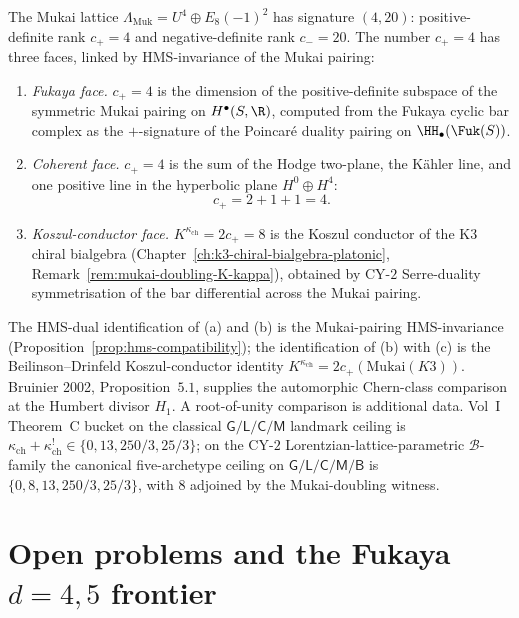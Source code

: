 \begin{remark}
\label{rem:fuk-three-faces-of-8}
The Mukai lattice $\Lambda_{\mathrm{Muk}} = U^4 \oplus E_8(-1)^2$ has signature $(4,20)$: positive-definite rank $c_+ = 4$ and negative-definite rank $c_- = 20$. The number $c_+ = 4$ has three faces, linked by HMS-invariance of the Mukai pairing:
\begin{enumerate}[label=(\alph*)]
 \item \emph{Fukaya face.} $c_+ = 4$ is the dimension of the positive-definite subspace of the symmetric Mukai pairing on $H^\bullet(S,\R)$, computed from the Fukaya cyclic bar complex as the $+$-signature of the Poincar\'{e} duality pairing on $\HH_\bullet(\Fuk(S))$.
 \item \emph{Coherent face.} $c_+ = 4$ is the sum of the Hodge two-plane, the K\"ahler line, and one positive line in the hyperbolic plane \(H^0\oplus H^4\):
 \[
 c_+ = 2 + 1 + 1 = 4.
 \]
 \item \emph{Koszul-conductor face.} $K^{\kappa_{\mathrm{ch}}} = 2c_+ = 8$ is the Koszul conductor of the K3 chiral bialgebra (Chapter~\ref{ch:k3-chiral-bialgebra-platonic}, Remark~\ref{rem:mukai-doubling-K-kappa}), obtained by CY-$2$ Serre-duality symmetrisation of the bar differential across the Mukai pairing.
\end{enumerate}
The HMS-dual identification of (a) and (b) is the Mukai-pairing HMS-invariance (Proposition~\ref{prop:hms-compatibility}); the identification of (b) with (c) is the Beilinson--Drinfeld Koszul-conductor identity \(K^{\kappa_{\mathrm{ch}}} = 2c_+(\mathrm{Mukai}(K3))\). Bruinier 2002, Proposition~\(5.1\), supplies the automorphic Chern-class comparison at the Humbert divisor \(H_1\). A root-of-unity comparison is additional data. Vol~I Theorem~C bucket on the classical $\mathsf{G}/\mathsf{L}/\mathsf{C}/\mathsf{M}$ landmark ceiling is $\kappa_{\mathrm{ch}} + \kappa_{\mathrm{ch}}^! \in \{0, 13, 250/3, 25/3\}$; on the CY-$2$ Lorentzian-lattice-parametric $\mathcal B$-family the canonical five-archetype ceiling on $\mathsf{G}/\mathsf{L}/\mathsf{C}/\mathsf{M}/\mathsf{B}$ is $\{0, 8, 13, 250/3, 25/3\}$, with $8$ adjoined by the Mukai-doubling witness.
\end{remark}


\section{Open problems and the Fukaya \texorpdfstring{$d = 4, 5$}{d = 4, 5} frontier}
\label{sec:fukaya-frontier}

